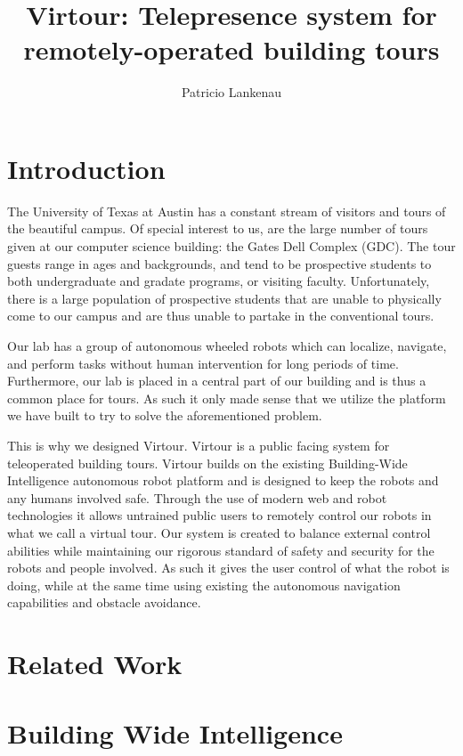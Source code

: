 \documentclass[
  oneside,
  11pt, a4paper,
  footinclude=true,
  headinclude=true,
  cleardoublepage=empty
]{article}
\title{Virtour: Telepresence system for remotely-operated building tours}
\author{Patricio Lankenau}
\begin{document}
\maketitle

\section{Introduction}

The University of Texas at Austin has a constant stream of visitors and tours
of the beautiful campus. Of special interest to us, are the large number of
tours given at our computer science building: the Gates Dell Complex (GDC). The
tour guests range in ages and backgrounds, and tend to be prospective students
to both undergraduate and gradate programs, or visiting faculty. Unfortunately,
there is a large population of prospective students that are unable to
physically come to our campus and are thus unable to partake in the
conventional tours.

Our lab has a group of autonomous wheeled robots which can localize, navigate,
and perform tasks without human intervention for long periods of time.
Furthermore, our lab is placed in a central part of our building and is thus a
common place for tours. As such it only made sense that we utilize the platform
we have built to try to solve the aforementioned problem.

This is why we designed Virtour. Virtour is a public facing system for
teleoperated building tours. Virtour builds on the existing Building-Wide
Intelligence autonomous robot platform and is designed to keep the robots and
any humans involved safe. Through the use of modern web and robot technologies
it allows untrained public users to remotely control our robots in what we call
a virtual tour. Our system is created to balance external control abilities
while maintaining our rigorous standard of safety and security for the robots
and people involved. As such it gives the user control of what the robot is
doing, while at the same time using existing the autonomous navigation
capabilities and obstacle avoidance.

\section{Related Work}

\section{Building Wide Intelligence}
\end{document}
